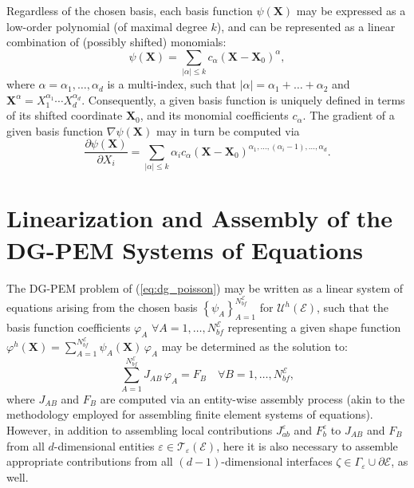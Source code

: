 		Regardless of the chosen basis, each basis function $\psi (\mathbf{X})$ may be expressed as a low-order polynomial (of maximal degree $k$), and can be represented as a linear combination of (possibly shifted) monomials:
		\begin{equation}
			\psi (\mathbf{X}) = \sum_{|\alpha| \leq k} c_\alpha (\mathbf{X}-\mathbf{X}_0)^{\alpha},
		\end{equation}
		where $\alpha = \alpha_1, \ldots, \alpha_d$ is a multi-index, such that $|\alpha| = \alpha_1 + \ldots + \alpha_2$ and $\mathbf{X}^\alpha = X_1^{\alpha_1} \cdots X_d^{\alpha_d}$. Consequently, a given basis function is uniquely defined in terms of its shifted coordinate $\mathbf{X}_0$, and its monomial coefficients $c_\alpha$. The gradient of a given basis function $\nabla \psi (\mathbf{X})$ may in turn be computed via
		\begin{equation}
			\frac{\partial \psi (\mathbf{X})}{\partial X_i} = \sum_{|\alpha| \leq k} \alpha_i c_\alpha (\mathbf{X}-\mathbf{X}_0)^{\alpha_1, \ldots, (\alpha_i - 1), \ldots, \alpha_d}.
		\end{equation}
		
\section{Linearization and Assembly of the \\ DG-PEM Systems of Equations}

	The DG-PEM problem of (\ref{eq:dg_poisson}) may be written as a linear system of equations arising from the chosen basis $\left\{ \psi_A \right\}_{A=1}^{N^\mathcal{E}_{bf}}$ for $\mathcal{U}^h (\mathcal{E})$, such that the basis function coefficients $\varphi_A \, \, \forall A = 1, \ldots, N^\mathcal{E}_{bf}$ representing a given shape function $\varphi^h (\mathbf{X}) = \sum_{A=1}^{N^\mathcal{E}_{bf}} \psi_A (\mathbf{X}) \, \varphi_A$ may be determined as the solution to:
	\begin{equation}
		\sum_{A=1}^{N^\mathcal{E}_{bf}} J_{AB} \, \varphi_A = F_B \quad \forall B = 1, \ldots, N^\mathcal{E}_{bf},
		\label{eq:linearization_dgpem}
	\end{equation}
	where $J_{AB}$ and $F_B$ are computed via an entity-wise assembly process (akin to the methodology employed for assembling finite element systems of equations). However, in addition to assembling local contributions $J^\varepsilon_{ab}$ and $F^\varepsilon_b$ to $J_{AB}$ and $F_B$ from all $d$-dimensional entities $\varepsilon \in \mathcal{T}_\varepsilon (\mathcal{E})$, here it is also necessary to assemble appropriate contributions from all $(d-1)$-dimensional interfaces $\zeta \in \Gamma_\varepsilon \cup \partial \mathcal{E}$, as well.

